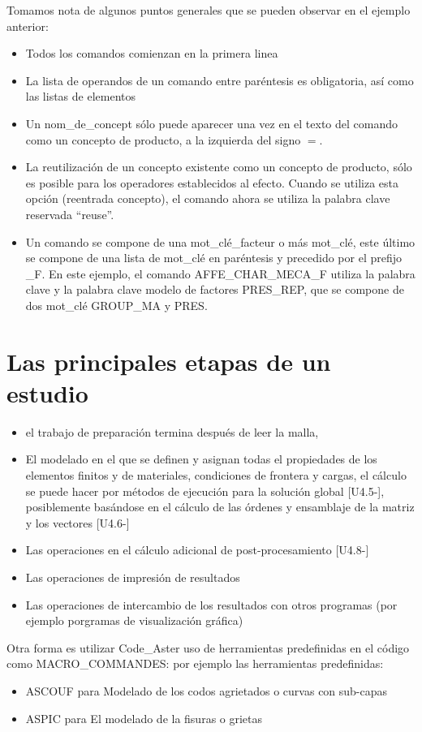 \documentclass[12pt]{book}
\theoremstyle{definition}
\theoremstyle{remark}
\theoremstyle{plain}
\begin{document}
Tomamos nota de algunos puntos generales que se pueden observar en el ejemplo anterior:
\begin{itemize}
 \item Todos los comandos comienzan en la primera linea
 \item La lista de operandos de un comando entre paréntesis es obligatoria, así como las listas de elementos
 \item Un nom\_de\_concept sólo puede aparecer una vez en el texto del comando como un concepto de producto, a la izquierda del signo $=$.
 \item La reutilización de un concepto existente como un concepto de producto, sólo es posible para los operadores establecidos al 
efecto. Cuando se utiliza esta opción (reentrada concepto), el comando ahora se utiliza la palabra clave reservada ``reuse''.
 \item Un comando se compone de una mot\_clé\_facteur o más  mot\_clé, este último se compone de una lista de mot\_clé en paréntesis 
y precedido por el prefijo \_F. En este ejemplo, el comando AFFE\_CHAR\_MECA\_F  utiliza la palabra clave y la palabra clave modelo 
de factores PRES\_REP, que se compone de dos mot\_clé GROUP\_MA y PRES.
\end{itemize}

\section{Las principales etapas de un estudio}
\begin{itemize}
 \item el trabajo de preparación termina después de leer la malla,
 \item El modelado en el que se definen y asignan todas el propiedades de los elementos finitos y de materiales,
condiciones de frontera y cargas, el cálculo se puede hacer por métodos de ejecución para la solución global [U4.5-],
posiblemente basándose en el cálculo de las órdenes y ensamblaje de la matriz y los vectores [U4.6-]
 \item Las operaciones en el cálculo adicional de post-procesamiento [U4.8-]
 \item Las operaciones de impresión de resultados
 \item Las operaciones de intercambio de los resultados con otros programas (por ejemplo porgramas de visualización gráfica)
\end{itemize}

Otra forma es utilizar Code\_Aster uso de herramientas predefinidas en el código como MACRO\_COMMANDES: por ejemplo las herramientas predefinidas:
\begin{itemize}
 \item ASCOUF para Modelado de los codos agrietados o curvas con sub-capas
 \item ASPIC para El modelado de la fisuras o grietas
\end{itemize}
\end{document}

